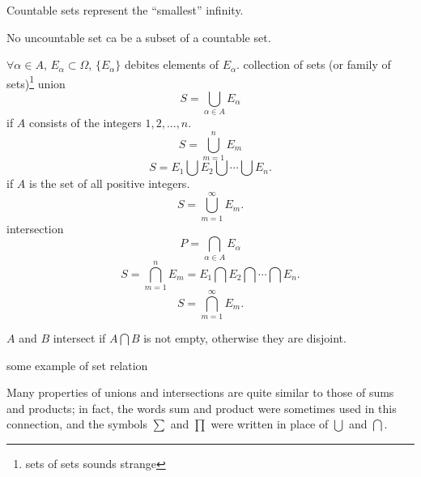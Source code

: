 Countable sets represent the ``smallest'' infinity.

No uncountable set ca be a subset of a countable set.


\begin{myDef}\label{myDef:2.9union_intersection}
    $\forall \alpha\in A$, $E_\alpha \subset \Omega$, $\{E_\alpha\}$ debites elements of $E_\alpha$. collection of sets (or family of sets)\footnote{sets of sets sounds strange}    
    union
    \begin{equation}\label{eq:2.1 union}
        S = \bigcup_{\alpha\in A} E_\alpha
    \end{equation}
    if $A$ consists of the integers $1,2,...,n$.
    \begin{equation}\label{eq:2.2 union finite}
        S = \bigcup_{m=1}^n E_m
    \end{equation}
    \begin{equation}\label{eq:2.3 union finite2}
        S = E_1 \bigcup E_2 \bigcup \cdots \bigcup E_n.
    \end{equation}
    if $A$ is the set of all positive integers.
    \begin{equation}\label{eq:2.4 union countable}
        S = \bigcup_{m=1}^{\infty} E_m.
    \end{equation}
    intersection
    \begin{equation}\label{eq:2.5 intersection}
        P = \bigcap_{\alpha\in A} E_\alpha
    \end{equation}
    \begin{equation}\label{eq:2.6 intersection finite}
        S = \bigcap_{m=1}^n E_m = E_1 \bigcap E_2 \bigcap \cdots \bigcap E_n.
    \end{equation}
    \begin{equation}\label{eq:2.7 intersection countable}
        S = \bigcap_{m=1}^{\infty} E_m.
    \end{equation}

    $A$ and $B$ intersect if $A\bigcap B$ is not empty, otherwise they are disjoint.
\end{myDef}

\begin{myExample}
    some example of set relation
\end{myExample}

\begin{myRemark}
    Many properties of unions and intersections are quite similar to those of sums and products; in fact, the words sum and product were sometimes used in this connection, and the symbols $\sum$ and $\prod$ were written in place of $\bigcup$ and $\bigcap$.
\end{myRemark}

